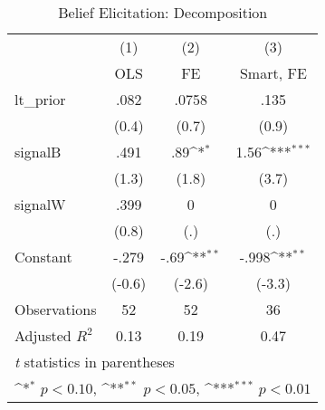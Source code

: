 \begin{table}[htbp]\centering
\def\sym#1{\ifmmode^{#1}\else\(^{#1}\)\fi}
\caption{Belief Elicitation: Decomposition}
\begin{tabular}{l*{3}{c}}
\hline\hline
                &\multicolumn{1}{c}{(1)}&\multicolumn{1}{c}{(2)}&\multicolumn{1}{c}{(3)}\\
                &\multicolumn{1}{c}{OLS}&\multicolumn{1}{c}{FE}&\multicolumn{1}{c}{Smart, FE}\\
\hline
lt\_prior        &     .082         &    .0758         &     .135         \\
                &    (0.4)         &    (0.7)         &    (0.9)         \\
signalB         &     .491         &      .89\sym{*}  &     1.56\sym{***}\\
                &    (1.3)         &    (1.8)         &    (3.7)         \\
signalW         &     .399         &        0         &        0         \\
                &    (0.8)         &      (.)         &      (.)         \\
Constant        &    -.279         &     -.69\sym{**} &    -.998\sym{**} \\
                &   (-0.6)         &   (-2.6)         &   (-3.3)         \\
\hline
Observations    &       52         &       52         &       36         \\
Adjusted \(R^{2}\)&     0.13         &     0.19         &     0.47         \\
\hline\hline
\multicolumn{4}{l}{\footnotesize \textit{t} statistics in parentheses}\\
\multicolumn{4}{l}{\footnotesize \sym{*} \(p<0.10\), \sym{**} \(p<0.05\), \sym{***} \(p<0.01\)}\\
\end{tabular}
\end{table}
